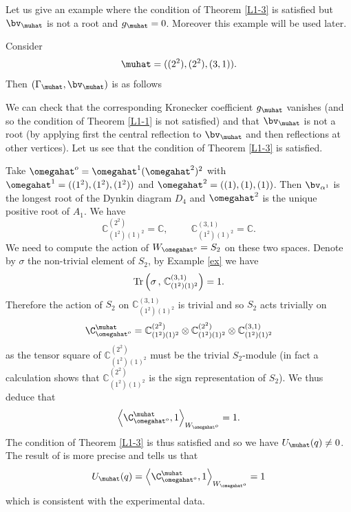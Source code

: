 \begin{exam}Let us give an example where the condition of Theorem \ref{L1-3} is satisfied but $\bv_\muhat$ is not a root and $g_\muhat= 0$. Moreover this example will be used later.
	
	Consider 
	$$
	\muhat=((2^2),(2^2),(3,1)).
	$$
	Then $(\Gamma_\muhat,\bv_\muhat)$ is as follows
	
	{\footnotesize{
			\begin{center}
	\end{center}}}
	
	
	We can check that the corresponding Kronecker coefficient $g_\muhat$ vanishes (and so the condition of Theorem \ref{L1-1} is not satisfied) and  that $\bv_\muhat$ is not a root (by applying first the central reflection to $\bv_\muhat$ and then  reflections at other vertices). Let us see that the condition of Theorem \ref{L1-3} is satisfied.
	
	Take $\omegahat^o=\omegahat^1(\omegahat^2)^2$ with $\omegahat^1=((1^2),(1^2),(1^2))$ and $\omegahat^2=((1),(1),(1))$. Then $\bv_{\alpha^1}$ is the longest root of the Dynkin diagram $D_4$ and $\omegahat^2$ is the unique positive root of $A_1$. We have
	$$
	\mathbb{C}_{(1^2)(1)^2}^{(2^2)}=\mathbb{C},\hspace{1cm}\mathbb{C}_{(1^2)(1)^2}^{(3,1)}=\mathbb{C}.
	$$
	We need to compute the action of $W_{\omegahat^o}=S_2$ on these two spaces. Denote by $\sigma$ the non-trivial element of $S_2$, by Example \ref{ex} we have
	$$
	{\rm Tr}\left(\sigma\,,\, \mathbb{C}^{(3,1)}_{(1^2)(1)^2}\right)=1.
	$$ 
	Therefore the action of $S_2$  on $\mathbb{C}_{(1^2)(1)^2}^{(3,1)}$ is trivial and so  $S_2$ acts trivially on
	$$
	\C_{\omegahat^o}^\muhat=\mathbb{C}_{(1^2)(1)^2}^{(2^2)}\otimes\mathbb{C}_{(1^2)(1)^2}^{(2^2)}\otimes\mathbb{C}_{(1^2)(1)^2}^{(3,1)}
	$$
	as the tensor square of $\mathbb{C}_{(1^2)(1)^2}^{(2^2)}$ must be the trivial $S_2$-module (in fact a calculation shows that $\mathbb{C}_{(1^2)(1)^2}^{(2^2)}$ is the sign representation of $S_2$). We thus deduce that
	$$
	\left\langle \C^\muhat_{\omegahat^o},1\right\rangle_{W_{\omegahat^o}}=1.
	$$
	The condition of Theorem \ref{L1-3} is thus satisfied and so we have  $U_\muhat(q)\neq 0$. The result of \cite{L1} is more precise and tells us that
	$$
	U_\muhat(q)=\left\langle \C^\muhat_{\omegahat^o},1\right\rangle_{W_{\omegahat^o}}=1
	$$
	which is consistent with the experimental data.
	\label{example}\end{exam}

